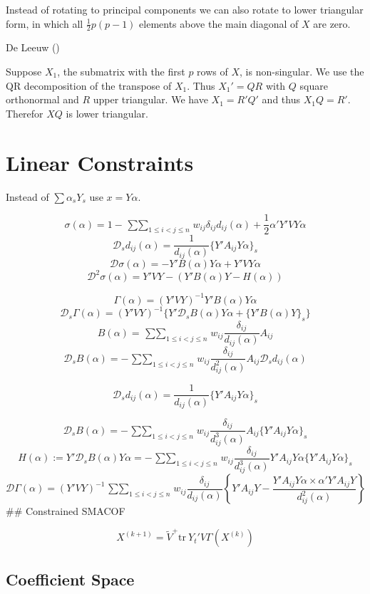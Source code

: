 \documentclass[
  12pt,
  letterpaper,
  DIV=11,
  numbers=noendperiod]{scrartcl}
\begin{document}
Instead of rotating to principal components we can also rotate to lower
triangular form, in which all \(\frac12 p(p-1)\) elements above the main
diagonal of \(X\) are zero.

De Leeuw ()

Suppose \(X_1\), the submatrix with the first \(p\) rows of \(X\), is
non-singular. We use the QR decomposition of the transpose of \(X_1\).
Thus \(X_1'=QR\) with \(Q\) square orthonormal and \(R\) upper
triangular. We have \(X_1=R'Q'\) and thus \(X_1Q=R'\). Therefor \(XQ\)
is lower triangular.

\section{Linear Constraints}\label{linear-constraints}

Instead of \(\sum\alpha_sY_s\) use \(x=Y\alpha\).

\[
\sigma(\alpha)=1-\mathop{\sum\sum}_{1\leq i<j\leq n}w_{ij}\delta_{ij}d_{ij}(\alpha)+ \frac12\alpha'Y'VY\alpha
\] \[
\mathcal{D}_sd_{ij}(\alpha)=\frac{1}{d_{ij}(\alpha)}\{Y'A_{ij}Y\alpha\}_s
\] \[
\mathcal{D}\sigma(\alpha)=-Y'B(\alpha)Y\alpha+Y'VY\alpha
\] \[
\mathcal{D}^2\sigma(\alpha)=Y'VY-(Y'B(\alpha)Y-H(\alpha))
\]

\[
\Gamma(\alpha)=(Y'VY)^{-1}Y'B(\alpha)Y\alpha
\] \[
\mathcal{D}_s\Gamma(\alpha)=(Y'VY)^{-1}\{Y'\mathcal{D}_sB(\alpha)Y\alpha+\{Y'B(\alpha)Y\}_s\}
\] \[
B(\alpha)=\mathop{\sum\sum}_{1\leq i<j\leq n}w_{ij}\frac{\delta_{ij}}{d_{ij}(\alpha)}A_{ij}
\] \[
\mathcal{D}_s B(\alpha)=-\mathop{\sum\sum}_{1\leq i<j\leq n}w_{ij}\frac{\delta_{ij}}{d_{ij}^2(\alpha)}A_{ij}
\mathcal{D}_s d_{ij}(\alpha)
\]

\[
\mathcal{D}_sd_{ij}(\alpha)=\frac{1}{d_{ij}(\alpha)}\{Y'A_{ij}Y\alpha\}_s
\]

\[
\mathcal{D}_sB(\alpha)=-\mathop{\sum\sum}_{1\leq i<j\leq n}w_{ij}\frac{\delta_{ij}}{d_{ij}^3(\alpha)}A_{ij}
\{Y'A_{ij}Y\alpha\}_s
\] \[
H(\alpha):=Y'\mathcal{D}_sB(\alpha)Y\alpha=-\mathop{\sum\sum}_{1\leq i<j\leq n}w_{ij}\frac{\delta_{ij}}{d_{ij}^3(\alpha)}Y'A_{ij}Y\alpha
\{Y'A_{ij}Y\alpha\}_s
\] \[
\mathcal{D}\Gamma(\alpha)=(Y'VY)^{-1}\mathop{\sum\sum}_{1\leq i<j\leq n}w_{ij}\frac{\delta_{ij}}{d_{ij}(\alpha)}
\left\{Y'A_{ij}Y-\frac{Y'A_{ij}Y\alpha\times \alpha'Y'A_{ij}Y}{d_{ij}^2(\alpha)}\right\}
\] \#\# Constrained SMACOF

\[
  X^{(k+1)}=\tilde V^+\text{tr}\ Y_t'V\Gamma(X^{(k)})
\]

\subsection{Coefficient Space}\label{coefficient-space}
\end{document}
